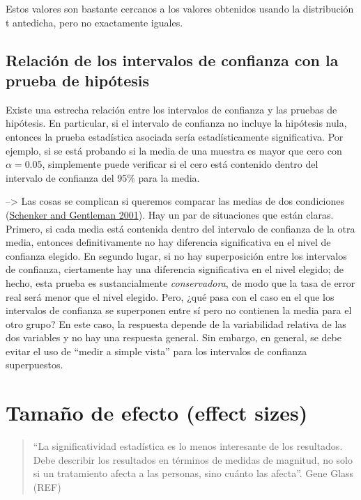 \documentclass[
  12pt,
]{book}
\begin{document}
Estos valores son bastante cercanos a los valores obtenidos usando la distribución t antedicha, pero no exactamente iguales.

\hypertarget{relaciuxf3n-de-los-intervalos-de-confianza-con-la-prueba-de-hipuxf3tesis}{%
\subsection{Relación de los intervalos de confianza con la prueba de hipótesis}\label{relaciuxf3n-de-los-intervalos-de-confianza-con-la-prueba-de-hipuxf3tesis}}

Existe una estrecha relación entre los intervalos de confianza y las pruebas de hipótesis. En particular, si el intervalo de confianza no incluye la hipótesis nula, entonces la prueba estadística asociada sería estadísticamente significativa. Por ejemplo, si se está probando si la media de una muestra es mayor que cero con \(\alpha = 0.05\), simplemente puede verificar si el cero está contenido dentro del intervalo de confianza del 95\% para la media.

--\textgreater{}
Las cosas se complican si queremos comparar las medias de dos condiciones (\protect\hyperlink{ref-sche:gent:2001}{Schenker and Gentleman 2001}). Hay un par de situaciones que están claras. Primero, si cada media está contenida dentro del intervalo de confianza de la otra media, entonces definitivamente no hay diferencia significativa en el nivel de confianza elegido. En segundo lugar, si no hay superposición entre los intervalos de confianza, ciertamente hay una diferencia significativa en el nivel elegido; de hecho, esta prueba es sustancialmente \emph{conservadora}, de modo que la tasa de error real será menor que el nivel elegido. Pero, ¿qué pasa con el caso en el que los intervalos de confianza se superponen entre sí pero no contienen la media para el otro grupo? En este caso, la respuesta depende de la variabilidad relativa de las dos variables y no hay una respuesta general. Sin embargo, en general, se debe evitar el uso de ``medir a simple vista'' para los intervalos de confianza superpuestos.

\hypertarget{tamauxf1o-de-efecto-effect-sizes}{%
\section{Tamaño de efecto (effect sizes)}\label{tamauxf1o-de-efecto-effect-sizes}}

\begin{quote}
``La significatividad estadística es lo menos interesante de los resultados. Debe describir los resultados en términos de medidas de magnitud, no solo si un tratamiento afecta a las personas, sino cuánto las afecta''. Gene Glass (REF)
\end{quote}
\end{document}
